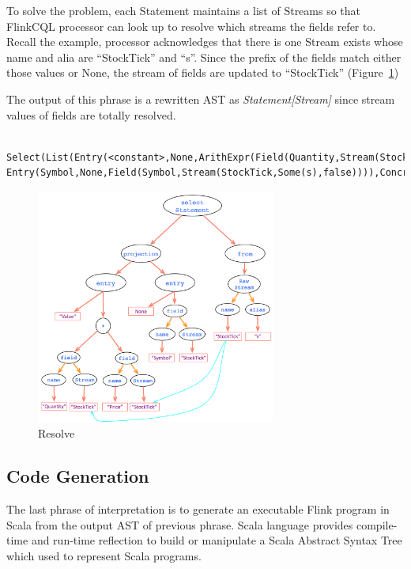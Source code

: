 To solve the problem, each Statement maintains a list of Streams so that FlinkCQL processor can look up to resolve which streams the fields refer to. Recall the example, processor acknowledges that there is one Stream exists whose name and alia are ``StockTick'' and ``s''. Since the prefix of the fields match either those values or None, the stream of fields are updated to ``StockTick'' (Figure~\ref{fig:Resolve})

The output of this phrase is a rewritten AST as \textit{Statement[Stream]} since stream values of  fields are totally resolved.

\begin{lstlisting}
	Select(List(Entry(<constant>,None,ArithExpr(Field(Quantity,Stream(StockTick,Some(s),false)),*,Field(Price,Stream(StockTick,Some(s),false)))), Entry(Symbol,None,Field(Symbol,Stream(StockTick,Some(s),false)))),ConcreteStream(Stream(StockTick,Some(s),false),None,None),None,None)

\end{lstlisting}

\begin{figure}[h!] 
\centering    
\includegraphics[width=0.7\textwidth]{Resolve}
\caption{Resolve}
\label{fig:Resolve}
\end{figure}


\subsection{Code Generation}
The last phrase of interpretation is to generate an executable Flink program in Scala from the output AST of previous phrase. Scala language provides compile-time and run-time reflection to build or manipulate a Scala Abstract Syntax Tree which used to represent Scala programs. 

